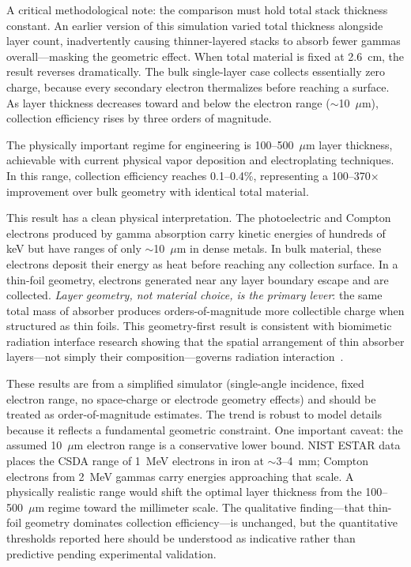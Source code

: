 \documentclass[12pt]{article}
\begin{document}
A critical methodological note: the comparison must hold total stack thickness constant.
An earlier version of this simulation varied total thickness alongside layer count,
inadvertently causing thinner-layered stacks to absorb fewer gammas overall---masking
the geometric effect. When total material is fixed at 2.6~cm, the result reverses
dramatically. The bulk single-layer case collects essentially zero charge, because
every secondary electron thermalizes before reaching a surface. As layer thickness
decreases toward and below the electron range ($\sim$10~$\mu$m), collection efficiency
rises by three orders of magnitude.

The physically important regime for engineering is 100--500~$\mu$m layer thickness,
achievable with current physical vapor deposition and electroplating techniques. In this
range, collection efficiency reaches 0.1--0.4\%, representing a 100--370$\times$
improvement over bulk geometry with identical total material.

This result has a clean physical interpretation. The photoelectric and Compton electrons
produced by gamma absorption carry kinetic energies of hundreds of keV but have ranges
of only $\sim$10~$\mu$m in dense metals. In bulk material, these electrons deposit their
energy as heat before reaching any collection surface. In a thin-foil geometry,
electrons generated near any layer boundary escape and are collected. \emph{Layer
geometry, not material choice, is the primary lever}: the same total mass of absorber
produces orders-of-magnitude more collectible charge when structured as thin foils.
This geometry-first result is consistent with biomimetic radiation interface research
showing that the spatial arrangement of thin absorber layers---not simply their
composition---governs radiation interaction~\cite{vasileiou2020}.

These results are from a simplified simulator (single-angle incidence, fixed electron
range, no space-charge or electrode geometry effects) and should be treated as
order-of-magnitude estimates. The trend is robust to model details because it reflects
a fundamental geometric constraint. One important caveat: the assumed 10~$\mu$m electron
range is a conservative lower bound. NIST ESTAR data places the CSDA range of 1~MeV
electrons in iron at $\sim$3--4~mm; Compton electrons from 2~MeV gammas carry energies
approaching that scale. A physically realistic range would shift the optimal layer
thickness from the 100--500~$\mu$m regime toward the millimeter scale. The qualitative
finding---that thin-foil geometry dominates collection efficiency---is unchanged, but
the quantitative thresholds reported here should be understood as indicative rather
than predictive pending experimental validation.
\end{document}
